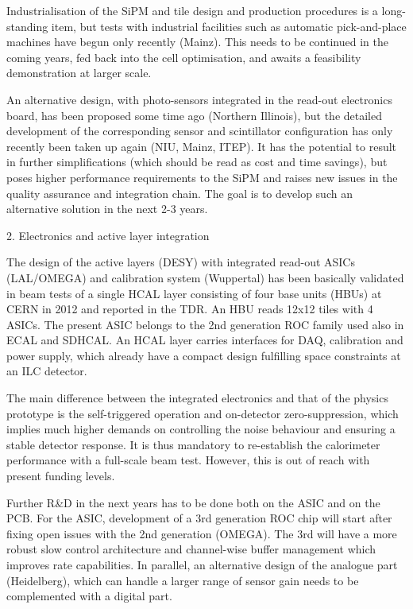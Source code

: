 Industrialisation of the SiPM and tile design and production procedures is a long-standing item, but tests with industrial facilities such as automatic pick-and-place machines have begun only recently (Mainz). This needs to be continued in the coming years, fed back into the cell optimisation, and awaits a feasibility demonstration at larger scale. 

An alternative design, with photo-sensors integrated in the read-out electronics board, has been proposed some time ago (Northern Illinois), but the detailed development of the corresponding sensor and scintillator configuration has only recently been taken up again (NIU, Mainz, ITEP). It has the potential to result in further simplifications (which should be read as cost and time savings), but poses higher performance requirements to the SiPM and raises new issues in the quality assurance and integration chain. The goal is to develop such an alternative solution in the next 2-3 years.
 
2.  Electronics and active layer integration

The design of the active layers (DESY) with integrated read-out ASICs (LAL/OMEGA) and calibration system (Wuppertal) has been basically validated in beam tests of a single HCAL layer consisting of four base units (HBUs) at CERN in 2012 and reported in the TDR. An HBU reads 12x12 tiles with 4 ASICs. The present ASIC belongs to the 2nd generation ROC family used also in ECAL and SDHCAL. An HCAL layer carries interfaces for DAQ, calibration and power supply, which already have a compact design fulfilling space constraints at an ILC detector. 

The main difference between the integrated electronics and that of the physics prototype is the self-triggered operation and on-detector zero-suppression, which implies much higher demands on controlling the noise behaviour and ensuring a stable detector response. It is thus mandatory to re-establish the calorimeter performance with a full-scale beam test. However, this is out of reach with present funding levels. 

Further R\&D in the next years has to be done both on the ASIC and on the PCB. For the ASIC, development of a 3rd generation ROC chip will start after fixing open issues with the 2nd generation (OMEGA). The 3rd will have a more robust slow control architecture and channel-wise buffer management which improves rate capabilities. In parallel, an alternative design of the analogue part (Heidelberg), which can handle a larger range of sensor gain needs to be complemented with a digital part. 

